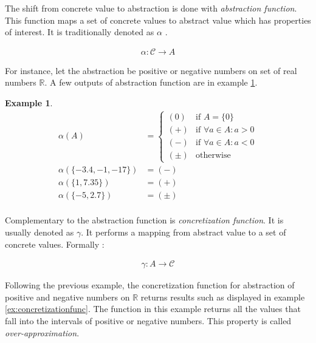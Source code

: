 \documentclass[12pt,final,oneside]{fithesis2}
\theoremstyle{definition}
\newtheorem{example}{Example}
\begin{document}
The shift from concrete value to abstraction is done with
\textit{abstraction function}. This function maps a set of concrete values
to abstract value which has properties of interest. It is traditionally
denoted as $\alpha$ \cite{CousotCousot76-1}.

\begin{align*}
\alpha : \mathcal{C} \to A
\end{align*}

For instance, let the abstraction be positive or negative numbers on set of
real numbers $\mathbb{R}$. A few outputs of abstraction function are in
example \ref{ex:abstractionfunc}.

\begin{example}
\label{ex:abstractionfunc}
\begin{align*}
\alpha(A) &=
\begin{cases}
(0) & \text{if } A = \{ 0 \} \\
(+) & \text{if } \forall a \in A : a > 0 \\
(-) & \text{if } \forall a \in A : a < 0 \\
(\pm) & \text{otherwise}
\end{cases} \\
\alpha(\{ -3.4, -1, -17 \}) &= (-) \\
\alpha(\{ 1, 7.35 \}) &= (+) \\
\alpha(\{ -5, 2.7 \}) &= (\pm) \\
\end{align*}
\end{example}

Complementary to the abstraction function is \textit{concretization
function}. It is usually denoted as $\gamma$. It performs a mapping from
abstract value to a set of concrete values. Formally
\cite{CousotCousot76-1}:

\begin{align*}
\gamma : A \to \mathcal{C}
\end{align*}

Following the previous example, the concretization function for abstraction
of positive and negative numbers on $\mathbb{R}$ returns results such as
displayed in example \ref{ex:concretizationfunc}. The function in this
example returns all the values that fall into the intervals of positive
or negative numbers. This property is called \textit{over-approximation}.
\end{document}
